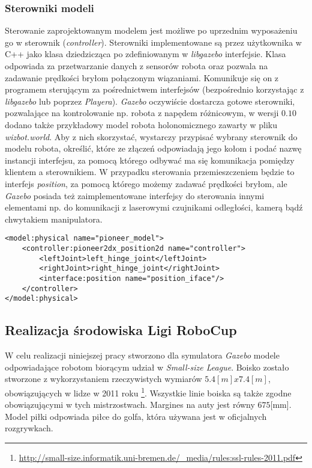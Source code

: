 	\subsubsection{Sterowniki modeli }
	Sterowanie zaprojektowanym modelem jest możliwe po uprzednim wyposażeniu go w sterownik (\textit{controller}). Sterowniki implementowane są przez użytkownika w C++ jako klasa dziedzicząca
	po zdefiniowanym w \textit{libgazebo} interfejsie. Klasa odpowiada za przetwarzanie danych z sensorów robota oraz pozwala
	na zadawanie prędkości bryłom połączonym wiązaniami. Komunikuje się on z programem sterującym za pośrednictwem interfejsów (bezpośrednio korzystając z \textit{libgazebo} lub poprzez \textit{Playera}).
	\textit{Gazebo} oczywiście dostarcza gotowe sterowniki, pozwalające na kontrolowanie np. robota z napędem różnicowym, w wersji $0.10$ dodano także przykładowy model robota holonomicznego zawarty
	w pliku \textit{wizbot.world}. Aby z nich skorzystać, wystarczy przypisać wybrany sterownik do modelu robota, określić, które ze złączeń odpowiadają jego kołom i podać nazwę instancji interfejsu,
	za pomocą którego odbywać ma się komunikacja pomiędzy klientem a sterownikiem. W przypadku sterowania przemieszczeniem będzie to interfejs \textit{position}, za pomocą którego możemy zadawać prędkości bryłom,
	ale \textit{Gazebo} posiada też zaimplementowane interfejsy do sterowania innymi elementami np. do komunikacji z laserowymi czujnikami odległości, kamerą bądź chwytakiem manipulatora. 
	\begin{lstlisting}
<model:physical name="pioneer_model">
    <controller:pioneer2dx_position2d name="controller">
        <leftJoint>left_hinge_joint</leftJoint>
        <rightJoint>right_hinge_joint</rightJoint>
        <interface:position name="position_iface"/>
    </controller>
</model:physical>
	\end{lstlisting}	

	
	\subsection{Realizacja środowiska Ligi RoboCup \label{subsect:realizacjaROBOCUP} }
	
	W celu realizacji niniejszej pracy stworzono dla symulatora \textit{Gazebo} modele odpowiadające robotom biorącym udział w \emph{Small-size League}. 
	Boisko zostało stworzone z wykorzystaniem rzeczywistych wymiarów $5.4[m] x 7.4[m]$, obowiązujących w lidze w 2011 roku 
	\protect\footnote{\url{http://small-size.informatik.uni-bremen.de/_media/rules:ssl-rules-2011.pdf}}. Wszystkie linie boiska są także zgodne obowiązującymi w tych mistrzostwach.
	Margines na auty jest równy $675$[mm].
	Model piłki odpowiada piłce do golfa, która używana jest w oficjalnych rozgrywkach.


